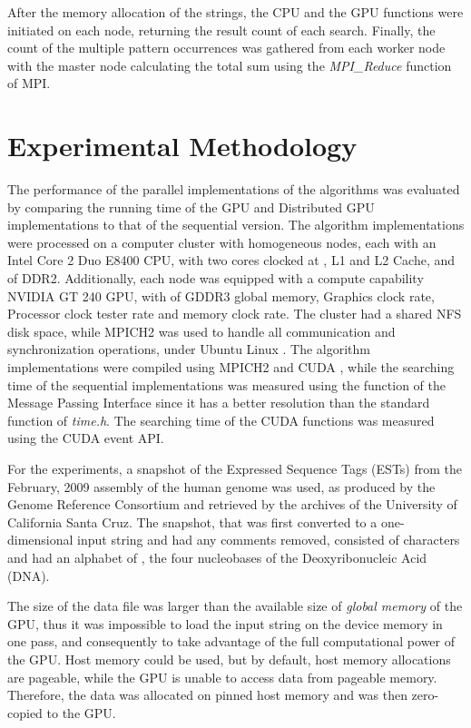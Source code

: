 \documentclass{ws-ijait}
\begin{document}
After the memory allocation of the strings, the CPU and the GPU functions were initiated on each node, returning the result count of each search. Finally, the count of the multiple pattern occurrences was gathered from each worker node with the master node calculating the total sum using the \textit{MPI\_Reduce} function of MPI.

\section{Experimental Methodology}
\label{sec:experimental-methodology}

The performance of the parallel implementations of the algorithms was evaluated by comparing the running time of the GPU and Distributed GPU implementations to that of the sequential version. The algorithm implementations were processed on a computer cluster with  homogeneous nodes, each with an Intel Core 2 Duo E8400 CPU, with two cores clocked at ,  L1 and  L2 Cache, and  of DDR2. Additionally, each node was equipped with a compute capability  NVIDIA GT 240 GPU, with  of GDDR3 global memory,  Graphics clock rate,  Processor clock tester rate and  memory clock rate. The cluster had a shared NFS disk space, while MPICH2 was used to handle all communication and synchronization operations, under Ubuntu Linux . The algorithm implementations were compiled using MPICH2 and CUDA , while the searching time of the sequential implementations was measured using the  function of the Message Passing Interface since it has a better resolution than the standard  function of \textit{time.h}. The searching time of the CUDA functions was measured using the CUDA event API.

For the experiments, a snapshot of the Expressed Sequence Tags (ESTs) from the February, 2009 assembly of the human genome was used, as produced by the Genome Reference Consortium and retrieved by the archives of the University of California Santa Cruz.\cite{ucsc2013} The snapshot, that was first converted to a one-dimensional input string and had any comments removed, consisted of  characters and had an alphabet of , the four nucleobases of the Deoxyribonucleic Acid (DNA).

The size of the data file was larger than the available size of \textit{global memory} of the GPU, thus it was impossible to load the input string on the device memory in one pass, and consequently to take advantage of the full computational power of the GPU. Host memory could be used, but by default, host memory allocations are pageable, while the GPU is unable to access data from pageable memory. Therefore, the data was allocated on pinned host memory and was then zero-copied to the GPU.
\end{document}
